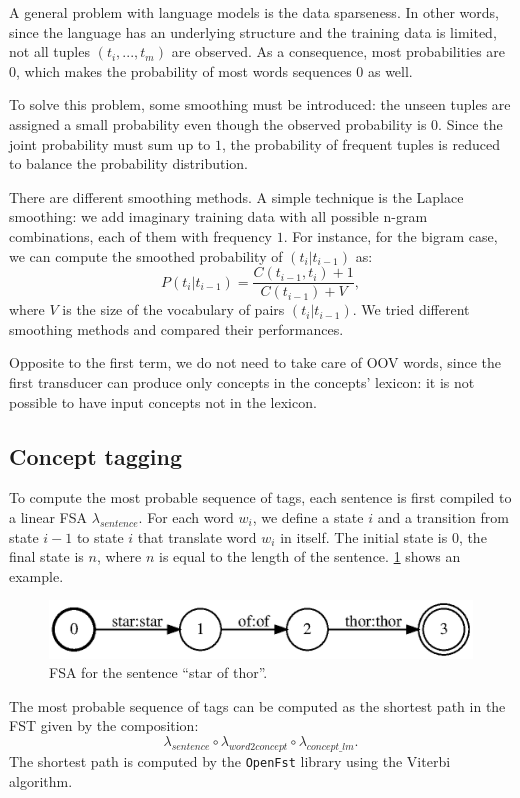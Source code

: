 A general problem with language models is the data sparseness.
In other words, since the language has an underlying structure and the training data is limited, not all tuples $(t_i, ..., t_m)$ are observed.
As a consequence, most probabilities are $0$, which makes the probability of most words sequences $0$ as well.

To solve this problem, some smoothing must be introduced:
the unseen tuples are assigned a small probability even though the observed probability is $0$.
Since the joint probability must sum up to $1$, the probability of frequent tuples is reduced to balance the probability distribution.

There are different smoothing methods.
A simple technique is the Laplace smoothing:
we add imaginary training data with all possible n-gram combinations, each of them with frequency $1$.
For instance, for the bigram case, we can compute the smoothed probability of $(t_i | t_{i-1})$ as:
\begin{equation*}
    P(t_i | t_{i-1}) = \frac{C(t_{i-1}, t_i) + 1}{C(t_{i-1}) + V},
\end{equation*}
where $V$ is the size of the vocabulary of pairs $(t_i | t_{i-1})$.
We tried different smoothing methods and compared their performances.

Opposite to the first term, we do not need to take care of \ac{OOV} words, since the first transducer can produce only concepts in the concepts' lexicon: it is not possible to have input concepts not in the lexicon.

\subsection{Concept tagging}
To compute the most probable sequence of tags, each sentence is first compiled to a linear \ac{FSA} $\lambda_{sentence}$.
For each word $w_i$, we define a state $i$ and a transition from state $i-1$ to state $i$ that translate word $w_i$ in itself.
The initial state is $0$, the final state is $n$, where $n$ is equal to the length of the sentence.
\cref{fig:fsa_sentence} shows an example.

\begin{figure}[h]
	\centering
	\includegraphics[width=.9\columnwidth]{figures/fsa}
	\caption{\ac{FSA} for the sentence ``star of thor''.}
	\label{fig:fsa_sentence}
\end{figure}


The most probable sequence of tags can be computed as the shortest path in the \ac{FST} given by the composition:
\begin{equation*}
    \lambda_{sentence} \circ \lambda_{word2concept} \circ \lambda_{concept\_lm}.
\end{equation*}
The shortest path is computed by the \texttt{OpenFst} library using the Viterbi algorithm.
